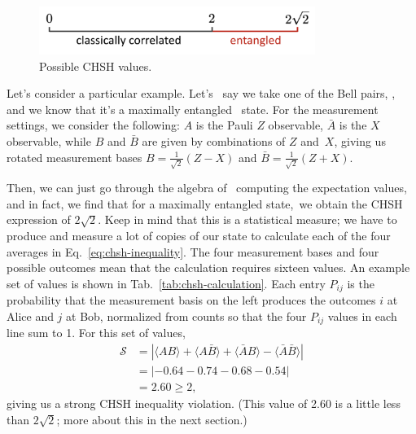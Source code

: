 \begin{figure}[H]
    \centering
    \includegraphics[width=0.8\textwidth]{lesson10/chsh-values.png}
        \caption{Possible CHSH values.}
    \label{fig:chsh-values}
\end{figure}

Let's consider a particular example. Let's 
say we take one of the Bell pairs, \ket{\Psi^+},
and we know that it's a maximally entangled 
state. For the measurement settings,
we consider the following: $A$ is the Pauli $Z$ 
observable, $\bar{A}$ is the $X$ observable, while $B$ and $\bar{B}$ are given by combinations of $Z$ and $X$, giving us rotated measurement bases $B=\frac{1}{\sqrt{2}}(Z-X)$ and $\bar{B}=\frac{1}{\sqrt{2}}(Z+X)$.

Then, we can just go through the algebra of 
computing the expectation values, and in fact, we find that for a maximally entangled state, we obtain the CHSH expression of $2\sqrt{2}$. Keep in mind that this is a statistical measure; we have to produce and measure a lot of copies of our state to calculate each of the four averages in Eq.~\ref{eq:chsh-inequality}. The four measurement bases and four possible outcomes mean that the calculation requires sixteen values. An example set of values is shown in Tab.~\ref{tab:chsh-calculation}.  Each entry $P_{ij}$ is the probability that the measurement basis on the left produces the outcomes $i$ at Alice and $j$ at Bob, normalized from counts so that the four $P_{ij}$ values in each line sum to 1.  For this set of values,
\begin{equation}
\begin{aligned}
\mathcal{S} &= |\langle A B\rangle+\langle A \bar{B}\rangle+\langle\bar{A} B\rangle-\langle\bar{A} \bar{B}\rangle| \\
&= | -0.64 -0.74 - 0.68 - 0.54 | \\
&= 2.60 \geq 2,
\end{aligned}
\label{eq:chsh-example}
\end{equation}
giving us a strong CHSH inequality violation.  (This value of 2.60 is a little less than $2\sqrt{2}$; more about this in the next section.)



